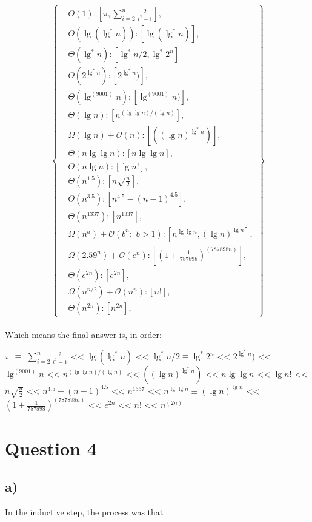 \documentclass[11pt,fleqn]{article}
\theoremstyle{definition}
\theoremstyle{remark}
\begin{document}
\[
\left\{
\begin{aligned}
& \Theta(1): [\pi, \sum_{i=2}^{n} \frac{2}{i^2 - 1}],\\
& \Theta(\lg(\lg^*n)): [\lg(\lg^*n)],\\
& \Theta(\lg^* n): [\lg^* n/2, \lg^* 2^n]\\
& \Theta(2^{\lg^*n}): [2^{\lg^*n})],\\
& \Theta(\lg^{(9001)} n): [\lg^{(9001)} n)],\\
& \Theta(\lg n): [n^{({\lg \lg n})/({\lg n})}],\\
& \Omega(\lg n) + \mathcal{O}(n): [({(\lg n)}^{\lg^*{n}})],\\
& \Theta(n\lg \lg n): [n\lg \lg n],\\
& \Theta(n\lg n): [\lg n!],\\
& \Theta(n^{1.5}): [n\sqrt{\frac{n}{2}}],\\
& \Theta(n^{3.5}): [n^{4.5} - (n - 1)^{4.5}],\\ 
& \Theta(n^{1337}): [n^{1337}],\\
& \Omega(n^a) + \mathcal{O}(b^n:\,\, b > 1): [n^{\lg \lg n}, (\lg n)^{\lg n}],\\
& \Omega(2.59^n) + \mathcal{O}(e^n): [{(1 + \frac{1}{787898})}^{(787898n)}],\\
& \Theta(e^{2n}): [e^{2n}],\\
& \Omega(n^{n/2}) + \mathcal{O}(n^n): [n!],\\
& \Theta(n^{2n}): [n^{2n}],
\end{aligned}
\right\}
\]\\


Which means the final answer is, in order:

$\pi$ $\equiv$ $\sum_{i=2}^{n} \frac{2}{i^2 - 1}$ << $\lg(\lg^*n)$ <<
$\lg^* n/2 \equiv \lg^* 2^n$ << $2^{\lg^*n})$ << $\lg^{(9001)} n$ << 
$n^{({\lg \lg n})/({\lg n})}$ << $({(\lg n)}^{\lg^*{n}})$ << $n\lg \lg n$ <<
$\lg n!$ << $n\sqrt{\frac{n}{2}}$ << $n^{4.5} - (n - 1)^{4.5}$ <<
$n^{1337}$ << $n^{\lg \lg n} \equiv (\lg n)^{\lg n}$ <<
${(1 + \frac{1}{787898})}^{(787898n)}$ << $e^{2n}$ << $n!$ << $n^{(2n)}$

\newpage
\clearpage

\section*{Question 4}

\subsection*{a)}
In the inductive step, the process was that
\end{document}
